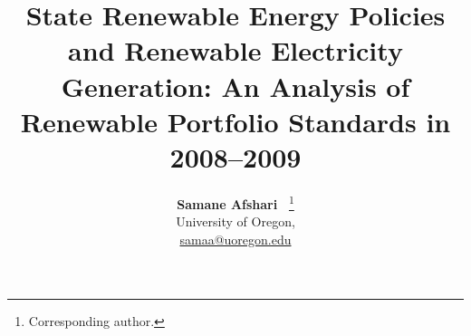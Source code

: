 \documentclass[
  12pt,
  letterpaper,
]{article}
\title{State Renewable Energy Policies and Renewable Electricity
Generation: An Analysis of Renewable Portfolio Standards in 2008--2009}
\author{
{\bfseries \normalsize Samane Afshari~\orcidlink{0000-0001-7237-8131}}%
\thanks{Corresponding author.} \\%
 \small University of Oregon,  \\%
{\footnotesize \url{samaa@uoregon.edu}} \\\vspace{10pt}
}
\date{}
\newenvironment{keywords}
{\small\sffamily{\sffamily\small\bfseries{Keywords.}}}
\begin{document}
\renewcommand{\abstractname}{Abstract.}


\maketitle
\begin{abstract}
\ldots..
\end{abstract}
\begin{keywords}
\def\sep{;\ }
Renewable Portfolio Standards\sep renewable energy production\sep 
US States
\end{keywords}


\section{Introduction}\label{introduction}

The transition toward renewable energy has become a central policy
objective in the United States as concerns over climate change, carbon
emissions, and fossil fuel dependence continue to intensify. In the
absence of a unified federal leadership, state governments have
increasingly emerged as major regulator in renewable energy governance
through different energy-related policy instruments.

Renewable Portfolio Standards (RPS) are among the most widely used
state-level policy mechanisms because they require utilities to generate
a specified share of electricity from renewable sources such as wind,
solar, geothermal, and biomass. By 2008, more than half of U.S. states
had adopted mandatory RPS programs, reflecting a broader shift toward
decentralized energy governance and state-led climate action.

Despite the rapid expansion of state renewable energy policies, there
remains ongoing debate regarding whether these policies actually
increase renewable energy production. Using PRS and Renewable
Electricity Generation as the main variables, this study examines
whether state-level renewable energy policies increase renewable
electricity generation across U.S. states during 2008 and 2009.

Existing literature has produced mixed findings on the effectiveness of
Renewable Portfolio Standards. Early studies often relied on qualitative
analyses or case studies that highlighted successful examples of
renewable energy deployment but provided limited empirical evidence
regarding broader policy effectiveness. More recent quantitative
research has attempted to evaluate the relationship between RPS policies
and renewable energy generation. For example, Carley (2009) examined
whether state RPS adoption increased the share of renewable electricity
generation across states and found that while RPS policies increased the
total amount of renewable generation, they did not significantly
increase renewable energy's share within total electricity production.
\end{document}
